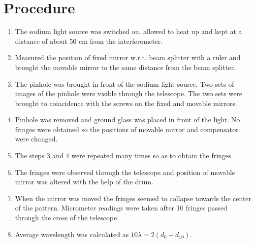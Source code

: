 \section{Procedure}
	\begin{enumerate}
	\item The sodium light source was switched on, allowed to heat up and kept at a distance of about 50 cm from the interferometer. 
	\item Measured the position of fixed mirror w.r.t. beam splitter with a ruler and brought the movable mirror to the same distance from the beam splitter.
	\item The pinhole was brought in front of the sodium light source. Two sets of images of the pinhole were visible through the telescope. The two sets were brought to coincidence with the screws on the fixed and movable mirrors. 
	\item Pinhole was removed and ground glass was placed in front of the light. No fringes were obtained so the positions of movable mirror and compensator were changed. 
	\item The steps 3 and 4 were repeated many times so as to obtain the fringes.
	\item The fringes were observed through the telescope and position of movable mirror was altered with the help of the drum. 
	\item When the mirror was moved the fringes seemed to collapse towards the center of the pattern. Micrometer readings were taken after 10 fringes passed through the cross of the telescope. 
	\item Average wavelength was calculated as $10\lambda = 2(d_0 - d_{10})$.

	\end{enumerate}

